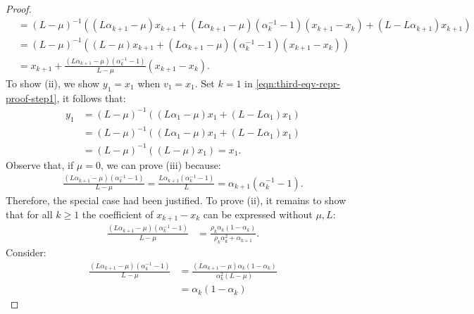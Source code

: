\documentclass[12pt]{article}
\begin{document}
\begin{proof}
{\begin{align*}
                &= (L - \mu)^{-1}
                \left(
                    (L\alpha_{k + 1} - \mu)x_{k + 1} +
                    (L\alpha_{k + 1} - \mu)(\alpha_k^{-1} - 1)(x_{k + 1} - x_k)
                    + (L - L \alpha_{k + 1})x_{k + 1}
                \right)
                \\
                &=
                (L - \mu)^{-1}
                \left(
                    (L - \mu)x_{k + 1} + (L\alpha_{k + 1} - \mu)(\alpha_k^{-1} - 1)(x_{k + 1} - x_k)
                \right)
                \\
                &= x_{k + 1} + \frac{(L\alpha_{k + 1} - \mu)(\alpha_k^{-1} - 1)}{L - \mu}(x_{k + 1} - x_k).
            \end{align*}
            }
            To show (ii), we show $y_1 = x_1$ when $v_1 = x_1$.
            Set $k = 1$ in \eqref{eqn:third-eqv-repr-proof-step1}, it follows that:
            \begin{align*}
                y_1 &= (L - \mu)^{-1}((L\alpha_1 - \mu)x_1 + (L - L\alpha_1)x_1)
                \\
                &= (L - \mu)^{-1}((L\alpha_1 - \mu)x_1 + (L - L \alpha_1)x_1)
                \\
                &= (L - \mu)^{-1}((L - \mu)x_1) = x_1.
            \end{align*}
            Observe that, if $\mu = 0$, we can prove (iii) because:
            \begin{align*}
                \frac{(L\alpha_{k + 1} - \mu)(\alpha_k^{-1} - 1)}{L - \mu} =
                \frac{L\alpha_{k +1}(\alpha_k^{-1} - 1)}{L} = \alpha_{k +1}(\alpha_k^{-1} - 1).
            \end{align*}
            Therefore, the special case had been justified.
            To prove (ii), it remains to show that for all $k\ge 1$ the coefficient of $x_{k + 1} - x_k$ can be expressed without $\mu, L$:
            \begin{align*}
                \frac{(L\alpha_{k + 1} - \mu)(\alpha_k^{-1} - 1)}{L - \mu}
                &= \frac{\rho_k\alpha_k(1 - \alpha_k)}{\rho_k\alpha_k^2 + \alpha_{k + 1}}.
            \end{align*}
            Consider:
            \begin{align*}
                \frac{(L\alpha_{k + 1} - \mu)(\alpha_k^{-1} - 1)}{L - \mu}
                &= \frac{(L\alpha_{k + 1} - \mu)\alpha_k(1 - \alpha_k)}{\alpha_k^2(L - \mu)}
                \\
                &=
                \alpha_k(1 - \alpha_k)

\end{align*}
\end{proof}
\end{document}
